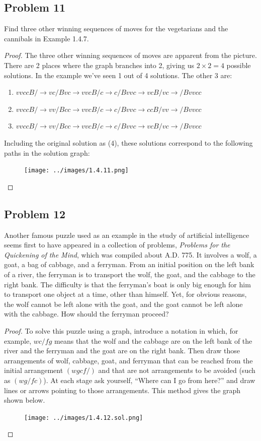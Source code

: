 \documentclass[14pt]{extarticle}
\begin{document}
\subsection{Problem 11}
Find three other winning sequences of moves for the vegetarians and the
cannibals in Example 1.4.7.

\begin{proof}
The three other winning sequences of moves are apparent from the picture.
There are 2 places where the graph branches into 2, giving us $2 \times 2 = 4$
possible solutions. In the example we've seen 1 out of 4 solutions. The other 3
are:
\begin{enumerate}
\item $vvccB/ \to vc/Bvc \to vvcB/c \to c/Bvvc \to vcB/vc \to /Bvvcc$
\item $vvccB/ \to vv/Bcc \to vvcB/c \to c/Bvvc \to ccB/vv \to /Bvvcc$
\item $vvccB/ \to vv/Bcc \to vvcB/c \to c/Bvvc \to vcB/vc \to /Bvvcc$
\end{enumerate}

Including the original solution as (4), these solutions correspond to the
following paths in the solution graph:

\begin{figure}[ht!]
\centering
\texttt{[image: ../images/1.4.11.png]}
\end{figure}
\end{proof}

\subsection{Problem 12}
Another famous puzzle used as an example in the study of artificial
intelligence seems first to have appeared in a collection of problems, {\it
Problems for the Quickening of the Mind}, which was compiled about A.D. 775. It
involves a wolf, a goat, a bag of cabbage, and a ferryman. From an initial
position on the left bank of a river, the ferryman is to transport the wolf,
the goat, and the cabbage to the right bank. The difficulty is that the
ferryman’s boat is only big enough for him to transport one object at a time,
other than himself. Yet, for obvious reasons, the wolf cannot be left alone with
the goat, and the goat cannot be left alone with the cabbage. How should the
ferryman proceed?

\begin{proof}
To solve this puzzle using a graph, introduce a notation in which, for example,
$wc / fg$ means that the wolf and the cabbage are on the left bank of the river
and the ferryman and the goat are on the right bank. Then draw those
arrangements of wolf, cabbage, goat, and ferryman that can be reached from the
initial arrangement $(wgcf /)$ and that are not arrangements to be avoided
(such as $(wg / fc)$). At each stage ask yourself, “Where can I go from here?”
and draw lines or arrows pointing to those arrangements. This method gives the
graph shown below.

\begin{figure}[ht!]
\centering
\texttt{[image: ../images/1.4.12.sol.png]}
\end{figure}
\end{proof}
\end{document}
